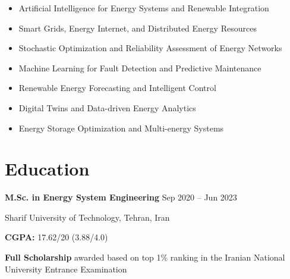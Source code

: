 \documentclass[letter,20pt]{article}
\begin{document}
\begin{itemize}
[
noitemsep,
topsep=5pt,
leftmargin=3ex
]

\item Artificial Intelligence for Energy Systems and Renewable Integration

\item Smart Grids, Energy Internet, and Distributed Energy Resources

\item Stochastic Optimization and Reliability Assessment of Energy Networks

\item Machine Learning for Fault Detection and Predictive Maintenance

\item Renewable Energy Forecasting and Intelligent Control

\item Digital Twins and Data-driven Energy Analytics

\item Energy Storage Optimization and Multi-energy Systems

\end{itemize}




\section{\textbf{Education}}

\vspace{5pt}



\textbf{M.Sc. in Energy System Engineering}
\hfill
{\footnotesize Sep 2020 -- Jun 2023}

\vspace{4pt}

\hspace{10pt}
Sharif University of Technology, Tehran, Iran

\hfill

\textbf{CGPA:}
17.62/20 (3.88/4.0)


\vspace{4pt}

\hspace{10pt}
\textbf{Full Scholarship}
awarded based on top 1\% ranking in the Iranian National University Entrance Examination
\end{document}
